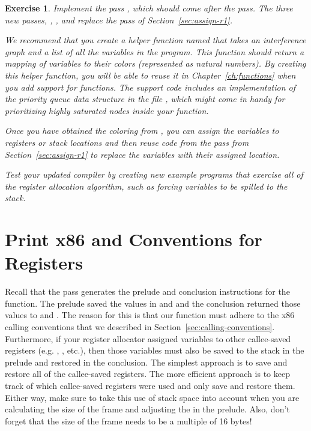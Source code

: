 \documentclass[11pt]{book}
\newtheorem{exercise}[theorem]{Exercise}
\begin{document}
\begin{exercise}\normalfont
  Implement the pass , which should come
  after the  pass. The three new passes,
  , , and
   replace the  pass of
  Section~\ref{sec:assign-r1}.
  
  We recommend that you create a helper function named
   that takes an interference graph and a list of
  all the variables in the program. This function should return a
  mapping of variables to their colors (represented as natural
  numbers). By creating this helper function, you will be able to
  reuse it in Chapter~\ref{ch:functions} when you add support for
  functions. The support code includes an implementation of the
  priority queue data structure in the file
  , which might come in handy for
  prioritizing highly saturated nodes inside your 
  function.

  Once you have obtained the coloring from , you can
  assign the variables to registers or stack locations and then reuse
  code from the  pass from
  Section~\ref{sec:assign-r1} to replace the variables with their
  assigned location.
  
  Test your updated compiler by creating new example programs that
  exercise all of the register allocation algorithm, such as forcing
  variables to be spilled to the stack.
\end{exercise}


\section{Print x86 and Conventions for Registers}
\label{sec:print-x86-reg-alloc}

Recall that the  pass generates the prelude and
conclusion instructions for the  function.
%
The prelude saved the values in  and  and the
conclusion returned those values to  and .  The
reason for this is that our  function must adhere to the
x86 calling conventions that we described in
Section~\ref{sec:calling-conventions}.  Furthermore, if your register
allocator assigned variables to other callee-saved registers
(e.g. , , etc.), then those variables must also be
saved to the stack in the prelude and restored in the conclusion.  The
simplest approach is to save and restore all of the callee-saved
registers. The more efficient approach is to keep track of which
callee-saved registers were used and only save and restore
them. Either way, make sure to take this use of stack space into
account when you are calculating the size of the frame and adjusting
the  in the prelude. Also, don't forget that the size of the
frame needs to be a multiple of 16 bytes!
\end{document}
